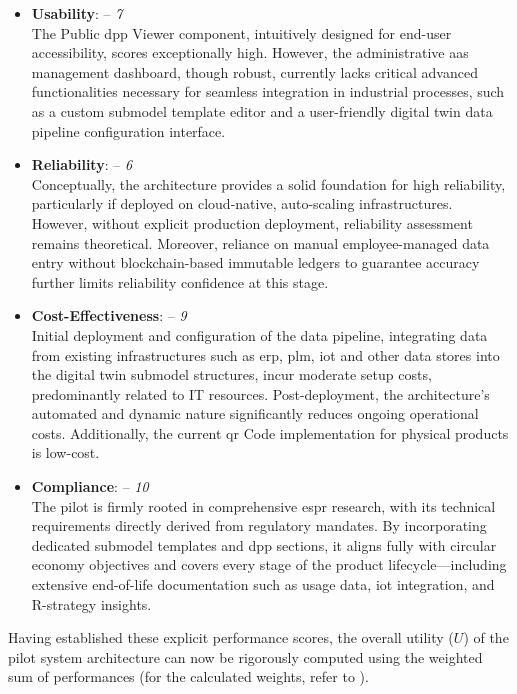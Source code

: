 \begin{itemize}[itemsep=0.5\baselineskip]
    \item \textbf{Usability}: – \textit{7}\\
    The Public \ac{dpp} Viewer component, intuitively designed for end-user accessibility, scores exceptionally high. However, the administrative \ac{aas} management dashboard, though robust, currently lacks critical advanced functionalities necessary for seamless integration in industrial processes, such as a custom submodel template editor and a user-friendly digital twin data pipeline configuration interface.

    \item \textbf{Reliability}: – \textit{6}\\
    Conceptually, the architecture provides a solid foundation for high reliability, particularly if deployed on cloud-native, auto-scaling infrastructures. However, without explicit production deployment, reliability assessment remains theoretical. Moreover, reliance on manual employee-managed data entry without blockchain-based immutable ledgers to guarantee accuracy further limits reliability confidence at this stage.

    \item \textbf{Cost-Effectiveness}: – \textit{9}\\
    Initial deployment and configuration of the data pipeline, integrating data from existing infrastructures such as \ac{erp}, \ac{plm}, \ac{iot} and other data stores into the digital twin submodel structures, incur moderate setup costs, predominantly related to IT resources. Post-deployment, the architecture's automated and dynamic nature significantly reduces ongoing operational costs. Additionally, the current \ac{qr} Code implementation for physical products is low-cost.

    \item \textbf{Compliance}: – \textit{10}\\
    The pilot is firmly rooted in comprehensive \ac{espr} research, with its technical requirements directly derived from regulatory mandates. By incorporating dedicated submodel templates and \ac{dpp} sections, it aligns fully with circular economy objectives and covers every stage of the product lifecycle—including extensive end-of-life documentation such as usage data, \ac{iot} integration, and R-strategy insights.
\end{itemize}

Having established these explicit performance scores, the overall utility (\(U\)) of the pilot system architecture can now be rigorously computed using the weighted sum of performances (for the calculated weights, refer to ).

